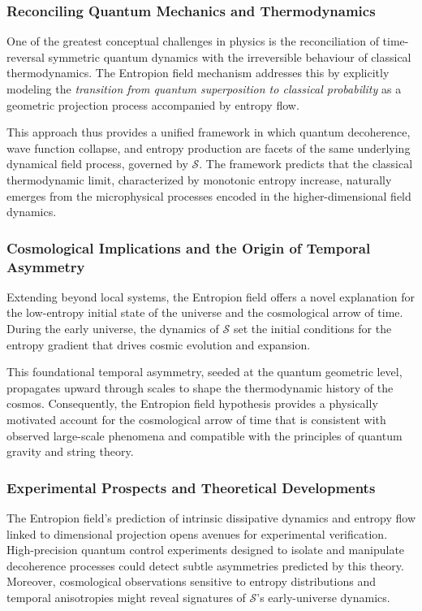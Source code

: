 \documentclass[12pt]{article}
\begin{document}
\subsubsection*{Reconciling Quantum Mechanics and Thermodynamics}

One of the greatest conceptual challenges in physics is the reconciliation of time-reversal symmetric quantum dynamics with the irreversible behaviour of classical thermodynamics. The Entropion field mechanism addresses this by explicitly modeling the \emph{transition from quantum superposition to classical probability} as a geometric projection process accompanied by entropy flow.

This approach thus provides a unified framework in which quantum decoherence, wave function collapse, and entropy production are facets of the same underlying dynamical field process, governed by $\mathcal{S}$. The framework predicts that the classical thermodynamic limit, characterized by monotonic entropy increase, naturally emerges from the microphysical processes encoded in the higher-dimensional field dynamics.

\subsubsection*{Cosmological Implications and the Origin of Temporal Asymmetry}

Extending beyond local systems, the Entropion field offers a novel explanation for the low-entropy initial state of the universe and the cosmological arrow of time. During the early universe, the dynamics of $\mathcal{S}$ set the initial conditions for the entropy gradient that drives cosmic evolution and expansion.

This foundational temporal asymmetry, seeded at the quantum geometric level, propagates upward through scales to shape the thermodynamic history of the cosmos. Consequently, the Entropion field hypothesis provides a physically motivated account for the cosmological arrow of time that is consistent with observed large-scale phenomena and compatible with the principles of quantum gravity and string theory.

\subsubsection*{Experimental Prospects and Theoretical Developments}

The Entropion field’s prediction of intrinsic dissipative dynamics and entropy flow linked to dimensional projection opens avenues for experimental verification. High-precision quantum control experiments designed to isolate and manipulate decoherence processes could detect subtle asymmetries predicted by this theory. Moreover, cosmological observations sensitive to entropy distributions and temporal anisotropies might reveal signatures of $\mathcal{S}$’s early-universe dynamics.
\end{document}
